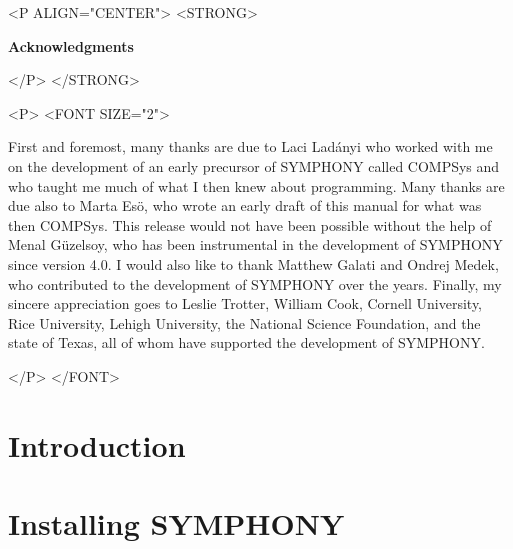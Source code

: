\documentclass[twoside,11pt]{book}
\begin{document}
\newpage

\thispagestyle{empty}

\vspace*{1in}
\begin{rawhtml} <P ALIGN="CENTER"> <STRONG> 
\end{rawhtml}
\begin{center}
\textbf{\large Acknowledgments}
\end{center}
\begin{rawhtml} </P> </STRONG> 
\end{rawhtml}
\begin{rawhtml} <P> <FONT SIZE="2"> 
\end{rawhtml}
First and foremost, many thanks are due to Laci Lad\'anyi who worked with me
on the development of an early precursor of SYMPHONY called COMPSys and who
taught me much of what I then knew about programming. Many thanks are due also
to Marta Es\"o, who wrote an early draft of this manual for what was then
COMPSys. This release would not have been possible without the help of Menal
G\"uzelsoy, who has been instrumental in the development of SYMPHONY since
version 4.0. I would also like to thank Matthew Galati and Ondrej Medek, who
contributed to the development of SYMPHONY over the years. Finally, my sincere
appreciation goes to Leslie Trotter, William Cook, Cornell University, Rice
University, Lehigh University, the National Science Foundation, and the state
of Texas, all of whom have supported the development of SYMPHONY.
\begin{rawhtml} </P> </FONT> 
\end{rawhtml}

\newpage

\thispagestyle{empty}

\newpage

\tableofcontents

\newpage

\mainmatter


\chapter{Introduction}


\chapter{Installing SYMPHONY}
\label{getting_started}

\end{document}
